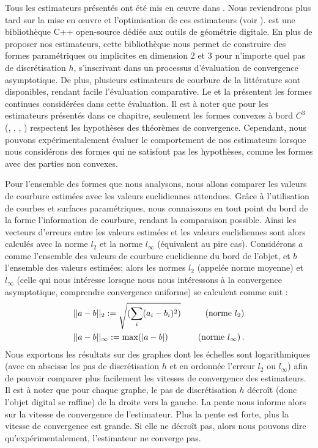 Tous les estimateurs présentés ont été mis en œuvre dans \DGtal \cite{DGtal}.
Nous reviendrons plus tard sur la mise en œuvre et l'optimisation de ces
estimateurs (voir ). \DGtal est une bibliothèque
C++ open-source dédiée aux outils de géométrie digitale. En plus de proposer nos
estimateurs, cette bibliothèque nous permet de construire des formes paramétriques
ou implicites en dimension 2 et 3 pour n'importe quel pas de discrétisation $h$,
s'inscrivant dans un processus d'évaluation de convergence asymptotique. De
plus, plusieurs estimateurs de courbure de la littérature sont disponibles,
rendant facile l'évaluation comparative. Le  et la
 présentent les formes continues considérées
dans cette évaluation. Il est à noter que pour les estimateurs présentés dans ce
chapitre, seulement les formes convexes à bord $C^3$ (\Ellipse, \Sphere,
\RoundedCube, \Ellipsoid) respectent les hypothèses des théorèmes de
convergence. Cependant, nous pouvons expérimentalement évaluer le comportement
de nos estimateurs lorsque nous considérons des formes qui ne satisfont pas les
hypothèses, comme les formes avec des parties non convexes.


Pour l'ensemble des formes que nous analysons, nous allons comparer les valeurs
de courbure estimées avec les valeurs euclidiennes attendues. Grâce à
l'utilisation de courbes et surfaces paramétriques, nous connaissons en tout
point du bord de la forme l'information de courbure, rendant la
comparaison possible. Ainsi les vecteurs d'erreurs entre les valeurs estimées et les valeurs
euclidiennes sont alors calculés avec la norme $l_2$ et la norme $l_\infty$
(équivalent au pire cas).
%
Considérons $a$ comme l'ensemble des valeurs de courbure euclidienne du bord de
l'objet, et $b$ l'ensemble des valeurs estimées; alors les normes $l_2$ (appelée
norme moyenne) et $l_\infty$ (celle qui nous intéresse lorsque nous nous
intéressons à la convergence asymptotique, comprendre convergence uniforme) se
calculent comme suit :
%
\begin{align}
  &|| a - b ||_2 := \sqrt{(\sum_i(a_i - b_i)^2)} \quad &\text{(norme $l_2$)} \\
  &|| a - b ||_\infty := \max(|a - b|) \quad &\text{(norme $l_\infty$)} \,.
\end{align}
%
Nous exportons les résultats sur des graphes dont les échelles sont
logarithmiques (avec en abscisse les pas de discrétisation $h$ et en ordonnée
l'erreur $l_2$ ou $l_\infty$) afin de pouvoir comparer plus facilement les
vitesses de convergence des estimateurs. Il est à noter que pour chaque graphe, le pas
de discrétisation $h$ décroît (donc l'objet digital se raffine) de la droite
vers la gauche. La pente nous informe alors sur la vitesse de convergence de
l'estimateur. Plus la pente est forte, plus la vitesse de convergence
est grande. Si elle ne décroît pas, alors nous pouvons dire
qu'expérimentalement, l'estimateur ne converge pas.
%
